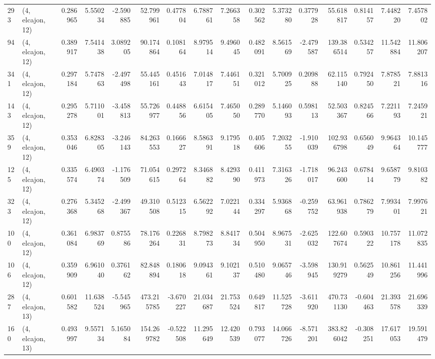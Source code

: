 \begin{tabular}{llrrrrrrrrrrrrrr}
293 &  (4, elcajon, 12) &   0.286965 &   5.550234 &  -2.590885 &    52.799961 &   0.477804 &   6.788761 &   7.266358 &  0.302562 &   5.373280 &   0.377928 &    55.618817 &  0.814157 &   7.448220 &   7.457802 \\
94  &  (4, elcajon, 12) &   0.389917 &   7.541438 &   3.089205 &    90.174864 &   0.108164 &   8.979514 &   9.496045 &  0.482091 &   8.561569 &  -2.479587 &   139.386514 &  0.534257 &  11.542884 &  11.806207 \\
341 &  (4, elcajon, 12) &   0.297184 &   5.747863 &  -2.497498 &    55.445161 &   0.451643 &   7.014817 &   7.446151 &  0.321012 &   5.700925 &   0.209888 &    62.115140 &  0.792450 &   7.878521 &   7.881316 \\
143 &  (4, elcajon, 12) &   0.295278 &   5.711001 &  -3.458813 &    55.726977 &   0.448856 &   6.615405 &   7.465050 &  0.289770 &   5.146093 &   0.598113 &    52.503367 &  0.824566 &   7.221193 &   7.245921 \\
359 &  (4, elcajon, 12) &   0.353046 &   6.828305 &  -3.246143 &    84.263553 &   0.166627 &   8.586391 &   9.179518 &  0.405606 &   7.203255 &  -1.910039 &   102.936798 &  0.656049 &   9.964364 &  10.145777 \\
125 &  (4, elcajon, 12) &   0.335574 &   6.490374 &  -1.176509 &    71.054615 &   0.297264 &   8.346882 &   8.429390 &  0.411973 &   7.316326 &  -1.718017 &    96.243600 &  0.678414 &   9.658779 &   9.810382 \\
323 &  (4, elcajon, 12) &   0.276368 &   5.345268 &  -2.499367 &    49.310508 &   0.512315 &   6.562292 &   7.022144 &  0.334297 &   5.936868 &  -0.259752 &    63.961938 &  0.786279 &   7.993401 &   7.997621 \\
100 &  (4, elcajon, 12) &   0.361084 &   6.983769 &   0.875586 &    78.176264 &   0.226831 &   8.798273 &   8.841734 &  0.504950 &   8.967531 &  -2.625032 &   122.607674 &  0.590322 &  10.757178 &  11.072835 \\
106 &  (4, elcajon, 12) &   0.359909 &   6.961040 &   0.376162 &    82.848894 &   0.180618 &   9.094361 &   9.102137 &  0.510480 &   9.065746 &  -3.598945 &   130.919279 &  0.562549 &  10.861256 &  11.441996 \\
287 &  (4, elcajon, 13) &   0.601582 &  11.638524 &  -5.545965 &   473.215785 &  -3.670227 &  21.034687 &  21.753524 &  0.649817 &  11.525728 &  -3.611920 &   470.731130 & -0.604463 &  21.393578 &  21.696339 \\
160 &  (4, elcajon, 13) &   0.493997 &   9.557134 &   5.165084 &   154.269782 &  -0.522508 &  11.295649 &  12.420539 &  0.793077 &  14.066726 &  -8.571201 &   383.826042 & -0.308251 &  17.617053 &  19.591479 \\

\end{tabular}

